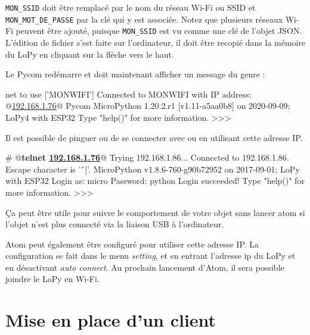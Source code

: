 
\texttt{MON\_SSID} doit être remplacé par le nom du réseau Wi-Fi ou \ac{SSID} et \texttt{MON\_MOT\_DE\_PASSE} par la clé qui y est associée. Notez que plusieurs réseaux Wi-Fi peuvent être ajouté, puisque \texttt{MON\_SSID} est vu comme une clé de l'objet JSON. L'édition de fichier s'est faite sur l'ordinateur, il doit être recopié dans la mémoire du LoPy en cliquant sur la flèche vers le haut.

Le Pycom redémarre et doit maintenant afficher un message du genre :

\begin{termc}[backgroundcolor=\color{gray!10}, language=json, basicstyle=\ttfamily\small, escapechar=@]
net to use ['MONWIFI']
Connected to MONWIFI with IP address: @\ul{192.168.1.76}@
Pycom MicroPython 1.20.2.r1 [v1.11-a5aa0b8] on 2020-09-09; LoPy4 with ESP32
Type "help()" for more information.
>>> 
\end{termc}



Il est possible de pinguer ou de se connecter avec  ou  en utilisant cette adresse IP.

\begin{termc}[backgroundcolor=\color{palerod}, language=json, basicstyle=\ttfamily\small, escapechar=@]
# @\textbf{telnet \ul{192.168.1.76}}@
Trying 192.168.1.86...
Connected to 192.168.1.86.
Escape character is ’ˆ]’.
MicroPython v1.8.6-760-g90b72952 on 2017-09-01; LoPy with ESP32
Login as: micro
Password: python
Login succeeded!
Type "help()" for more information.
>>>
\end{termc}


Ça peut être utile pour suivre le comportement de votre objet sans lancer atom si l'objet n'est plus connecté via la liaison USB à l'ordinateur. 

Atom peut également être configuré pour utiliser cette adresse IP. La configuration se fait dans le menu \textit{setting}, et en entrant l'adresse ip du LoPy et en désactivant \textit{auto connect}. Au prochain lancement d'Atom, il sera possible joindre le LoPy en Wi-Fi.


\section{Mise en place d'un client}

\begin{figure}
\end{figure}


